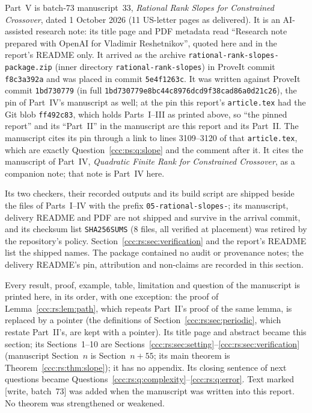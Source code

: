 \documentclass[11pt,letterpaper]{article}
\theoremstyle{definition}
\theoremstyle{remark}
\newcommand{\wsevthree}{\textup{[write, batch~73]}}
\begin{document}
Part~V is batch-73 manuscript~33, \emph{Rational Rank Slopes for Constrained
Crossover}, dated 1 October 2026 (11 US-letter pages as delivered). It is an
AI-assisted research note: its title page and PDF metadata read ``Research
note prepared with OpenAI for Vladimir Reshetnikov'', quoted here and in the
report's README only. It arrived as the archive
\texttt{rational-rank-slopes-package.zip} (inner directory
\texttt{rational-rank-slopes}) in ProveIt commit \texttt{f8c3a392a} and was
placed in commit \texttt{5e4f1263c}. It was written against ProveIt commit
\texttt{1bd730779} (in full
\nolinkurl{1bd730779e8bc44c8976dcd9f38cad86a0d21c26}), the pin of Part~IV's
manuscript as well; at the pin this report's \texttt{article.tex} had the
Git blob \texttt{ff492c83}, which holds Parts~I--III as printed above, so
``the pinned report'' and its ``Part~II'' in the manuscript are this report
and its Part~II. The manuscript cites its pin through a link to lines
3109--3120 of that \texttt{article.tex}, which are exactly
Question~\ref{ccc:ps:q:slope} and the comment after it. It cites the
manuscript of Part~IV, \emph{Quadratic Finite Rank for Constrained Crossover},
as a companion note; that note is Part~IV here.

Its two checkers, their recorded outputs and its build script are shipped
beside the files of Parts~I--IV with the prefix
\nolinkurl{05-rational-slopes-}; its manuscript, delivery README and PDF are
not shipped and survive in the arrival commit, and its checksum list
\texttt{SHA256SUMS} (8 files, all verified at placement) was retired by the
repository's policy. Section~\ref{ccc:rs:sec:verification} and the report's
README list the shipped names. The package contained no audit or provenance
notes; the delivery README's pin, attribution and non-claims are recorded in
this section.

Every result, proof, example, table, limitation and question of the
manuscript is printed here, in its order, with one exception: the proof of
Lemma~\ref{ccc:rs:lem:path}, which repeats Part~II's proof of the same
lemma, is replaced by a pointer (the definitions of
Section~\ref{ccc:rs:sec:periodic}, which restate Part~II's, are kept with a
pointer). Its title page
and abstract became this section; its Sections~1--10 are
Sections~\ref{ccc:rs:sec:setting}--\ref{ccc:rs:sec:verification}
(manuscript Section~$n$ is Section~$n+55$; its main theorem is
Theorem~\ref{ccc:rs:thm:slope}); it has no appendix. Its closing sentence of
next questions became
Questions~\ref{ccc:rs:q:complexity}--\ref{ccc:rs:q:error}. Text marked
\wsevthree{} was added when the manuscript was written into this report. No
theorem was strengthened or weakened.
\end{document}
